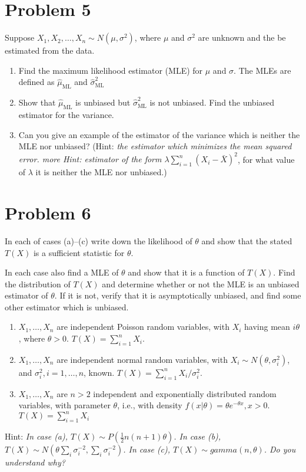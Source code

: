 \documentclass[11pt]{article}
\begin{document}

\section*{Problem 5} Suppose $X_1, X_2, \dots, X_n \sim N(\mu, \sigma^2)$, where $\mu$ and $\sigma^2$ are unknown and the be estimated from the data. 

\begin{enumerate}
    \item Find the maximum likelihood estimator (MLE) for $\mu$ and $\sigma$. The MLEs are defined as $\hat{\mu}_{\text{ML}}$ and $\hat{\sigma}^2_{\text{ML}}$
    
    \item Show that $\hat{\mu}_{\text{ML}}$ is unbiased but $\hat{\sigma}^2_{\text{ML}}$ is not unbiased. Find the unbiased estimator for the variance.
    
    \item Can you give an example of the estimator of the variance which is neither the MLE nor unbiased? (Hint: \emph{the estimator which minimizes the mean squared error. more Hint: estimator of the form $\lambda \sum^{n}_{i=1} (X_i - \bar{X})^2$}, for what value of $\lambda$ it is neither the MLE nor unbiased.)
\end{enumerate}

\section*{Problem 6}
In each of cases (a)–(c) write down the likelihood of $\theta$ and show that the stated $T(X)$ is a sufficient statistic for $\theta$.

In each case also find a MLE of $\theta$ and show that it is a function of $T(X)$. Find the distribution of $T(X)$ and determine whether or not the MLE is an unbiased estimator of $\theta$. If it is not, verify that it is asymptotically unbiased, and find some other estimator which is unbiased.
\begin{enumerate}
    \item $X_1, \dots, X_n$ are independent Poisson random variables, with $X_i$ having mean $i\theta$, where $\theta > 0$. $T(X) = \sum_{i=1}^n X_i$.
    
    \item $X_1, \dots, X_n$ are independent normal random variables, with $X_i \sim N(\theta, \sigma_i^2)$, and $\sigma^2_i, i=1, \dots, n$, known. $T(X) = \sum_{i=1}^n X_i/\sigma^2_i$.
    
    \item $X_1, \dots, X_n$ are $n>2$ independent and exponentially distributed random variables, with parameter $\theta$, i.e., with density $f(x | \theta) = \theta e^{-\theta x}, x > 0$. $T(X)=\sum_{i=1}^nX_i$
\end{enumerate}


\newline
Hint: \emph{In case (a), $T(X) \sim P(\frac{1}{2}n(n+1)\theta)$. In case (b), $T(X) \sim N(\theta \sum_i \sigma_i^{-2}, \sum_i \sigma_i^{-2})$. In case (c), $T(X) \sim gamma(n,\theta)$. Do you understand why? }
\end{document}
